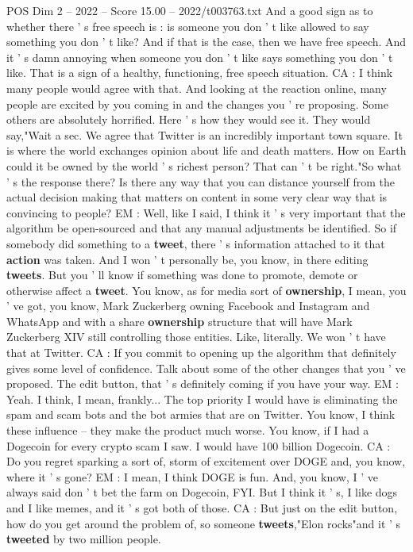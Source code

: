 \begin{textsample}{POS Dim 2 – 2022 – Score 15.00 – 2022/t003763.txt}
And a good sign as to whether there ' s free speech is : is someone you don ' t like allowed to say something you don ' t like?
And if that is the case, then we have free speech.
And it ' s damn annoying when someone you don ' t like says something you don ' t like.
That is a sign of a healthy, functioning, free speech situation.
CA : I think many people would agree with that.
And looking at the reaction online, many people are excited by you coming in and the changes you ' re proposing.
Some others are absolutely horrified.
Here ' s how they would see it.
They would say,"Wait a sec.
We agree that Twitter is an incredibly important town square.
It is where the world exchanges opinion about life and death matters.
How on Earth could it be owned by the world ' s richest person?
That can ' t be right."So what ' s the response there?
Is there any way that you can distance yourself from the actual decision making that matters on content in some very clear way that is convincing to people?
EM : Well, like I said, I think it ' s very important that the algorithm be open-sourced and that any manual adjustments be identified.
So if somebody did something to a \textbf{tweet}, there ' s information attached to it that \textbf{action} was taken.
And I won ' t personally be, you know, in there editing \textbf{tweets}.
But you ' ll know if something was done to promote, demote or otherwise affect a \textbf{tweet}.
You know, as for media sort of \textbf{ownership}, I mean, you ' ve got, you know, Mark Zuckerberg owning Facebook and Instagram and WhatsApp and with a share \textbf{ownership} structure that will have Mark Zuckerberg XIV still controlling those entities.
Like, literally.
We won ' t have that at Twitter.
CA : If you commit to opening up the algorithm that definitely gives some level of confidence.
Talk about some of the other changes that you ' ve proposed.
The edit button, that ' s definitely coming if you have your way.
EM : Yeah.
I think, I mean, frankly...
The top priority I would have is eliminating the spam and scam bots and the bot armies that are on Twitter.
You know, I think these influence -- they make the product much worse.
You know, if I had a Dogecoin for every crypto scam I saw.
I would have 100 billion Dogecoin.
CA : Do you regret sparking a sort of, storm of excitement over DOGE and, you know, where it ' s gone?
EM : I mean, I think DOGE is fun.
And, you know, I ' ve always said don ' t bet the farm on Dogecoin, FYI.
But I think it ' s, I like dogs and I like memes, and it ' s got both of those.
CA : But just on the edit button, how do you get around the problem of, so someone \textbf{tweets},"Elon rocks"and it ' s \textbf{tweeted} by two million people.

\end{textsample}
